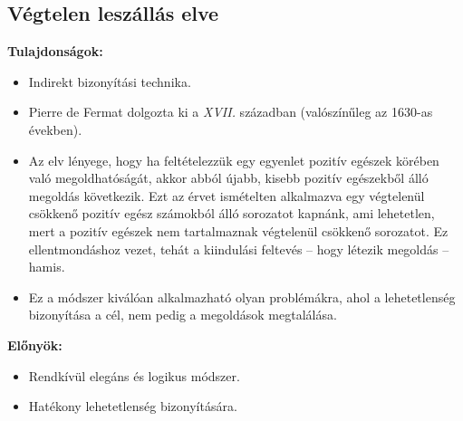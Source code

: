 \subsection*{Végtelen leszállás elve}

\noindent\textbf{Tulajdonságok:}
\begin{itemize}
	\item Indirekt bizonyítási technika. 
	\item Pierre de Fermat dolgozta ki a \textit{XVII.} században (valószínűleg
	az 1630-as években). 
	\item Az elv lényege, hogy ha feltételezzük egy egyenlet pozitív egészek
	körében való megoldhatóságát, akkor abból újabb, kisebb pozitív egészekből
	álló megoldás következik. Ezt az érvet ismételten alkalmazva egy végtelenül
	csökkenő pozitív egész számokból álló sorozatot kapnánk, ami lehetetlen,
	mert a pozitív egészek nem tartalmaznak végtelenül csökkenő sorozatot.
	Ez ellentmondáshoz vezet, tehát a kiindulási feltevés -- hogy létezik
	megoldás -- hamis.
	\item Ez a módszer kiválóan alkalmazható olyan problémákra, ahol a lehetetlenség
	bizonyítása a cél, nem pedig a megoldások megtalálása. 
\end{itemize}
\noindent\textbf{Előnyök:} 
\begin{itemize}
	\item Rendkívül elegáns és logikus módszer. 
	\item Hatékony lehetetlenség bizonyítására. 
\end{itemize}

